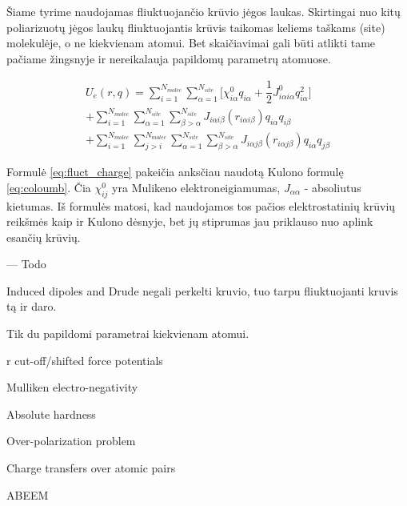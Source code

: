 Šiame tyrime naudojamas fliuktuojančio krūvio jėgos laukas.
Skirtingai nuo kitų poliarizuotų jėgos laukų fliuktuojantis krūvis taikomas keliems taškams (site) molekulėje, o ne kiekvienam atomui.
Bet skaičiavimai gali būti atlikti tame pačiame žingsnyje ir nereikalauja papildomų parametrų atomuose.

\begin{multline} \label{eq:fluct_charge}
U_{e}(r, q) = \sum\limits_{i=1}^{N_{molec}} \sum\limits_{\alpha=1}^{N_{site}}
{\bigg[\chi_{i\alpha}^0 q_{i\alpha} + \dfrac{1} {2} J_{i\alpha i\alpha}^0 q_{i\alpha}^2 \bigg]} \\
+ \sum\limits_{i=1}^{N_{molec}} \sum\limits_{\alpha=1}^{N_{site}} \sum\limits_{\beta>\alpha}^{N_{site}}
{J_{i\alpha i\beta} (r_{i\alpha i\beta}) q_{i\alpha} q_{i\beta}} \\
+ \sum\limits_{i=1}^{N_{molec}} \sum\limits_{j>i}^{N_{molec}} \sum\limits_{\alpha=1}^{N_{site}} \sum\limits_{\beta>\alpha}^{N_{site}}
{J_{i\alpha j\beta} (r_{i\alpha j\beta}) q_{i\alpha} q_{j\beta}}
\end{multline}

Formulė \ref{eq:fluct_charge} pakeičia anksčiau naudotą Kulono formulę \ref{eq:coloumb}.
Čia \(\chi_{ij}^0\) yra Mulikeno elektroneigiamumas, \(J_{\alpha\alpha}\) - absoliutus kietumas.
Iš formulės matosi, kad naudojamos tos pačios elektrostatinių krūvių reikšmės kaip ir Kulono dėsnyje,
bet jų stiprumas jau priklauso nuo aplink esančių krūvių.

--- Todo

Induced dipoles and Drude negali perkelti kruvio, tuo tarpu fliuktuojanti kruvis tą ir daro.

Tik du papildomi parametrai kiekvienam atomui.

r cut-off/shifted force potentials

Mulliken electro-negativity

Absolute hardness

Over-polarization problem

Charge transfers over atomic pairs

ABEEM
